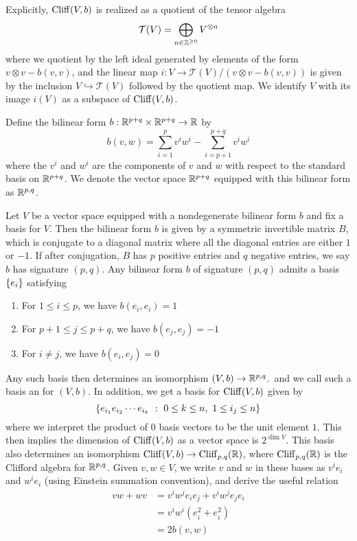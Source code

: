 %
Explicitly, $\operatorname{Cliff}(V,b)$ is realized as a quotient of the tensor algebra
\[
\mathcal{T}(V) = \bigoplus_{n \in \mathbb{Z}^{\geq 0}} V^{\otimes n}
\]
where we quotient by the left ideal generated by elements of the form
$v \otimes v - b(v,v)$, and the linear map
$i: V \to \mathcal{T}(V) / (v \otimes v - b(v,v))$
is given by the inclusion $V \hookrightarrow \mathcal{T}(V)$ followed by the
quotient map. We identify $V$ with its image $i(V)$ as a subspace of $\operatorname{Cliff}(V,b)$.
%
\begin{defn}
Define the bilinear form $b : \mathbb{R}^{p+q} \times \mathbb{R}^{p+q} \to \mathbb{R}$ by
\[
b(v,w) = \sum_{i = 1}^{p} v^iw^i - \sum_{i = p+1}^{p+q} v^iw^i
\]
where the $v^i$ and $w^i$ are the components of $v$ and $w$ with respect to
the standard basis on $\mathbb{R}^{p+q}$. We denote the vector space $\mathbb{R}^{p+q}$
equipped with this bilinear form as $\mathbb{R}^{p,q}$.
\end{defn}
%
Let $V$ be a vector space equipped with a nondegenerate bilinear form $b$ and
fix a basis for $V$. Then the bilinear form $b$ is given by a symmetric
invertible matrix $B$, which is conjugate to a diagonal matrix where all
the diagonal entries are either $1$ or $-1$. If after conjugation, $B$ has
$p$ positive entries and $q$ negative entries, we say $b$ has signature $(p,q)$.
Any bilinear form $b$ of signature $(p,q)$ admits a basis $\left\lbrace e_i \right\rbrace$ satisfying
%
\begin{enumerate}
  \item For $1 \leq i \leq p$, we have $b(e_i,e_i) = 1$
  \item For $p+1 \leq j \leq p+q$, we have $b(e_j,e_j) = -1$
  \item For $i \neq j$, we have $b(e_i,e_j) = 0$
\end{enumerate}
%
Any such basis then determines an isomorphism $(V,b) \to \mathbb{R}^{p,q}$.\, and we
call such a basis an  for $(V,b)$.
In addition, we get a basis for $\operatorname{Cliff}(V,b)$ given by
\[
\left\lbrace e_{i_1}e_{i_2}\cdots e_{i_k}~:~ 0 \leq k \leq n, ~ 1 \leq i_j \leq n \right\rbrace
\]
where we interpret the product of $0$ basis vectors to be the unit element $1$.
This then implies the dimension of $\operatorname{Cliff}(V,b)$ as a vector space is
$2^{\dim V}$. This basis also determines an isomorphism
$\operatorname{Cliff}(V,b) \to \operatorname{Cliff}_{p,q}(\mathbb{R})$, where $\operatorname{Cliff}_{p,q}(\mathbb{R})$ is the Clifford
algebra for $\mathbb{R}^{p,q}$. Given $v,w \in V$, we write $v$ and $w$ in these
bases as $v^ie_i$ and $w^ie_i$ (using Einstein summation convention),
and derive the useful relation
%
\begin{align*}
vw + wv &= v^iw^je_ie_j + v^iw^je_je_i \\
&= v^iw^i(e_i^2 + e_i^2) \\
&= 2b(v,w)
\end{align*}

